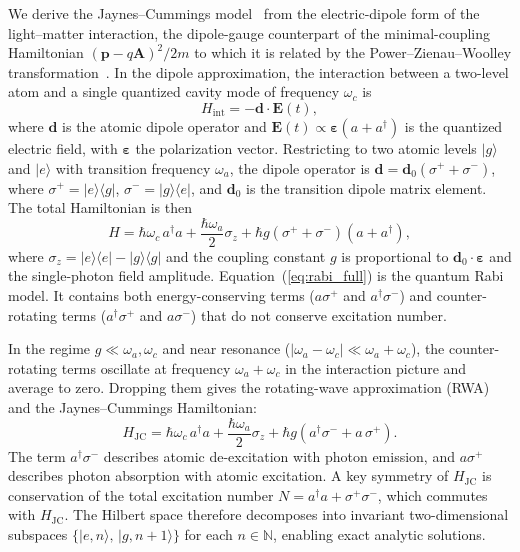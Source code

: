 \documentclass{iopjournal}
\begin{document}
We derive the Jaynes--Cummings model~\cite{jaynes1963} from the electric-dipole form of the light--matter interaction, the dipole-gauge counterpart of the minimal-coupling Hamiltonian $(\boldsymbol{p} - q\boldsymbol{A})^2/2m$ to which it is related by the Power--Zienau--Woolley transformation~\cite{scully1997}. In the dipole approximation, the interaction between a two-level atom and a single quantized cavity mode of frequency $\omega_c$ is
\begin{equation}
H_{\text{int}} = -\boldsymbol{d} \cdot \boldsymbol{E}(t),
\end{equation}
where $\boldsymbol{d}$ is the atomic dipole operator and $\boldsymbol{E}(t) \propto \boldsymbol{\varepsilon}(a + a^\dagger)$ is the quantized electric field, with $\boldsymbol{\varepsilon}$ the polarization vector. Restricting to two atomic levels $|g\rangle$ and $|e\rangle$ with transition frequency $\omega_a$, the dipole operator is $\boldsymbol{d} = \boldsymbol{d}_0(\sigma^+ + \sigma^-)$, where $\sigma^+ = |e\rangle\langle g|$, $\sigma^- = |g\rangle\langle e|$, and $\boldsymbol{d}_0$ is the transition dipole matrix element. The total Hamiltonian is then
\begin{equation}
H = \hbar\omega_c\, a^\dagger a + \frac{\hbar\omega_a}{2}\sigma_z + \hbar g(\sigma^+ + \sigma^-)(a + a^\dagger),
\label{eq:rabi_full}
\end{equation}
where $\sigma_z = |e\rangle\langle e| - |g\rangle\langle g|$ and the coupling constant $g$ is proportional to $\boldsymbol{d}_0 \cdot \boldsymbol{\varepsilon}$ and the single-photon field amplitude. Equation~(\ref{eq:rabi_full}) is the quantum Rabi model. It contains both energy-conserving terms ($a\sigma^+$ and $a^\dagger\sigma^-$) and counter-rotating terms ($a^\dagger\sigma^+$ and $a\sigma^-$) that do not conserve excitation number.

In the regime $g \ll \omega_a, \omega_c$ and near resonance ($|\omega_a - \omega_c| \ll \omega_a + \omega_c$), the counter-rotating terms oscillate at frequency $\omega_a + \omega_c$ in the interaction picture and average to zero. Dropping them gives the rotating-wave approximation (RWA) and the Jaynes--Cummings Hamiltonian:
\begin{equation}
H_{\text{JC}} = \hbar\omega_c\, a^\dagger a + \frac{\hbar\omega_a}{2}\sigma_z + \hbar g\left(a^\dagger \sigma^- + a\,\sigma^+\right).
\label{eq:HJC}
\end{equation}
The term $a^\dagger\sigma^-$ describes atomic de-excitation with photon emission, and $a\sigma^+$ describes photon absorption with atomic excitation. A key symmetry of $H_{\text{JC}}$ is conservation of the total excitation number $N = a^\dagger a + \sigma^+\sigma^-$, which commutes with $H_{\text{JC}}$. The Hilbert space therefore decomposes into invariant two-dimensional subspaces $\{|e, n\rangle,\, |g, n{+}1\rangle\}$ for each $n \in \mathbb{N}$, enabling exact analytic solutions.
\end{document}
